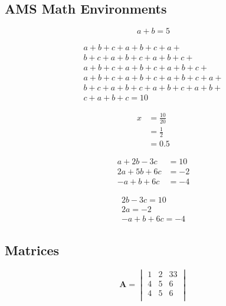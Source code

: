 \documentclass[12pt, a4paper]{article}
\begin{document}
\subsection{AMS Math Environments}

\begin{equation*}
    a + b = 5
\end{equation*}


\begin{multline}    
    a + b + c + a + b + c + a + \\
    b + c + a + b + c + a + b + c + \\
    a + b + c + a + b + c + a + b + c + \\
    a + b + c + a + b + c + a + b + c + a + \\
    b + c + a + b + c + a + b + c + a + b + \\
    c + a + b + c = 10
\end{multline}

\begin{equation}
    \begin{split}
         x &= \frac{10}{20} \\
         &= \frac{1}{2} \\
         &= 0.5
    \end{split}
\end{equation}

\begin{align}
    a + 2b - 3c &= 10 \\
    2a + 5b + 6c &= -2 \\
    -a + b + 6c &= -4
\end{align}

\begin{gather*}
    2b - 3c = 10 \\
    2a = -2 \\
    -a + b + 6c = -4
\end{gather*}

\subsection{Matrices}

\begin{equation*}
    \mathbf{A} = \begin{vmatrix}
        1 & 2 & 33 \\
        4 & 5 & 6 \\
        4 & 5 & 6 \\
    \end{vmatrix}
\end{equation*}
\end{document}
